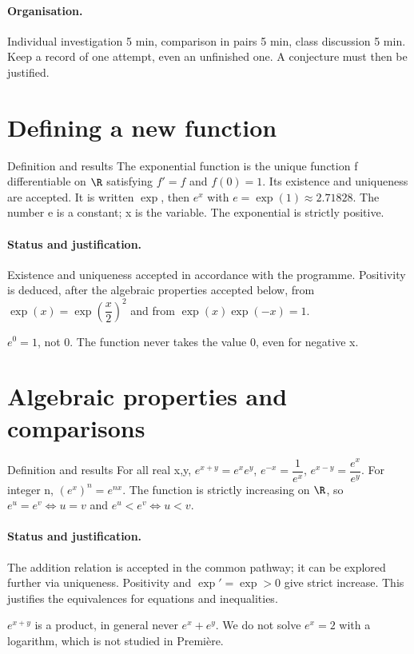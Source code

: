 \paragraph{Organisation.} Individual investigation 5 min, comparison in pairs 5 min, class discussion 5 min. Keep a record of one attempt, even an unfinished one. A conjecture must then be justified.
\section{Defining a new function}\label{C09-U1}
\begin{repere}{Definition and results}
The exponential function is the unique function f differentiable on $\R$ satisfying $f\prime=f$ and $f(0)=1$. Its existence and uniqueness are accepted. It is written $\exp$, then $e^x$ with $e=\exp(1)\approx2.71828$. The number e is a constant; x is the variable. The exponential is strictly positive.
\end{repere}
\paragraph{Status and justification.} Existence and uniqueness accepted in accordance with the programme. Positivity is deduced, after the algebraic properties accepted below, from $\exp (x)=\exp (\dfrac{x}{2})^2$ and from $\exp(x)\exp(-x)=1$.
\label{C09-EX1}

\begin{erreur}$e^0=1$, not 0. The function never takes the value 0, even for negative x.\end{erreur}
\label{C09-AP1}
\section{Algebraic properties and comparisons}\label{C09-U2}
\begin{repere}{Definition and results}
For all real x,y, $e^{x+y}=e^xe^y$, $e^{-x}=\dfrac{1}{e^x}$, $e^{x-y}=\dfrac{e^x}{e^y}$. For integer n, $(e^x)^n=e^{nx}$. The function is strictly increasing on $\R$, so $e^u=e^v\iff u=v$ and $e^u<e^v\iff u<v$.
\end{repere}
\paragraph{Status and justification.} The addition relation is accepted in the common pathway; it can be explored further via uniqueness. Positivity and $\exp\prime=\exp>0$ give strict increase. This justifies the equivalences for equations and inequalities.
\label{C09-EX2}
\begin{erreur}$e^{x+y}$ is a product, in general never $e^x+e^y$. We do not solve $e^x=2$ with a logarithm, which is not studied in Première.\end{erreur}
\label{C09-AP2}
